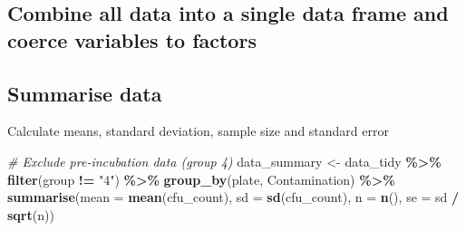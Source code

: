 \documentclass[
]{article}
\newenvironment{Shaded}{\begin{snugshade}}{\end{snugshade}}
\newcommand{\AttributeTok}[1]{\textcolor[rgb]{0.13,0.29,0.53}{#1}}
\newcommand{\CommentTok}[1]{\textcolor[rgb]{0.56,0.35,0.01}{\textit{#1}}}
\newcommand{\FunctionTok}[1]{\textcolor[rgb]{0.13,0.29,0.53}{\textbf{#1}}}
\newcommand{\NormalTok}[1]{#1}
\newcommand{\OtherTok}[1]{\textcolor[rgb]{0.56,0.35,0.01}{#1}}
\newcommand{\SpecialCharTok}[1]{\textcolor[rgb]{0.81,0.36,0.00}{\textbf{#1}}}
\newcommand{\StringTok}[1]{\textcolor[rgb]{0.31,0.60,0.02}{#1}}
\begin{document}
\subsection{Combine all data into a single data frame and coerce
variables to
factors}\label{combine-all-data-into-a-single-data-frame-and-coerce-variables-to-factors}

\begin{Shaded}
\end{Shaded}

\subsection{Summarise data}\label{summarise-data}

Calculate means, standard deviation, sample size and standard error

\begin{Shaded}
\begin{Highlighting}[]
\CommentTok{\# Exclude pre{-}incubation data (group 4)}
\NormalTok{data\_summary }\OtherTok{\textless{}{-}}\NormalTok{ data\_tidy }\SpecialCharTok{\%\textgreater{}\%}
  \FunctionTok{filter}\NormalTok{(group }\SpecialCharTok{!=} \StringTok{"4"}\NormalTok{) }\SpecialCharTok{\%\textgreater{}\%}
  \FunctionTok{group\_by}\NormalTok{(plate, Contamination) }\SpecialCharTok{\%\textgreater{}\%}
  \FunctionTok{summarise}\NormalTok{(}\AttributeTok{mean =} \FunctionTok{mean}\NormalTok{(cfu\_count),}
            \AttributeTok{sd =} \FunctionTok{sd}\NormalTok{(cfu\_count),}
            \AttributeTok{n =} \FunctionTok{n}\NormalTok{(),}
            \AttributeTok{se =}\NormalTok{ sd }\SpecialCharTok{/} \FunctionTok{sqrt}\NormalTok{(n))}
\end{Highlighting}
\end{Shaded}
\end{document}
